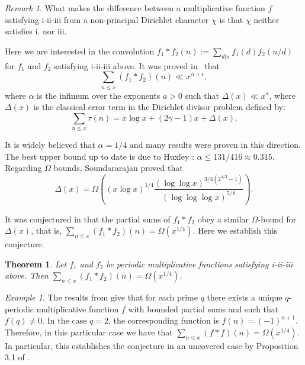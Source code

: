 \documentclass[a4paper,12pt, reqn0]{amsart}
\newtheorem{theorem}{Theorem}[section]
\theoremstyle{remark}
\newtheorem{example}{Example}[section]
\newtheorem{remark}{Remark}[section]
\begin{document}
\begin{remark} What makes the difference between a multiplicative
  function $f$ satisfying i-ii-iii from a non-principal Dirichlet
  character $\chi$ is that $\chi$ neither satisfies i. nor iii.
\end{remark}

Here we are interested in the convolution $f_1\ast f_2(n):=\sum_{d|n}f_1(d)f_2(n/d)$ for $f_1$ and
$f_2$ satisfying i-ii-iii above. It was proved in~\cite{Aymone*22}
that
\begin{equation*}
  \sum_{n\leq x}(f_1\ast f_2)(n)\ll x^{\alpha+\epsilon},
\end{equation*}
where $\alpha$ is the infimum over the exponents $a>0$ such that
$\Delta(x)\ll x^{a}$, where $\Delta(x)$ is the classical error term in
the Dirichlet divisor problem defined by:
\begin{equation*}
  \sum_{n\leq x}\tau(n)=x\log x +(2\gamma-1)x+\Delta(x).
\end{equation*}

It is widely believed that $\alpha=1/4$ and many results were proven in this direction. The best upper bound up to date is due to Huxley \cite{Huxley2003}: $\alpha\leq 131/416 \approx 0.315$. Regarding $\Omega$ bounds, Soundararajan \cite{sound_omega_divisor} proved that
$$\Delta(x)=\Omega\left((x\log x)^{1/4}\frac{(\log\log x)^{3/4(2^{4/3}-1)}}{(\log\log\log  x)^{5/8}}\right).$$

It was conjectured in \cite{Aymone*22} that the partial sums of
$f_1\ast f_2$ obey a similar $\Omega$-bound for $\Delta(x)$, that is,
$\sum_{n\leq x}(f_1\ast f_2)(n)=\Omega(x^{1/4})$. Here we establish
this conjecture.
\begin{theorem}
  \label{theorem principal}
  Let $f_1$ and $f_2$ be periodic multiplicative functions satisfying i-ii-iii above. Then
  $
    \sum_{n\leq x}(f_1\ast f_2)(n)=\Omega(x^{1/4})$.
\end{theorem}

\begin{example} The results from \cite{Aymone*22} give that for each
  prime $q$ there exists a unique $q$-periodic multiplicative function
  $f$ with bounded partial sums and such that $f(q)\neq 0$. In the
  case $q=2$, the corresponding function is
  $f(n)=(-1)^{n+1}$. Therefore, in this particular case we have that
  $\sum_{n\leq x}(f\ast f)(n)=\Omega(x^{1/4})$. In particular, this
  establishes the conjecture in an uncovered case by Proposition 3.1
  of \cite{Aymone*22}.
\end{example}
\end{document}
